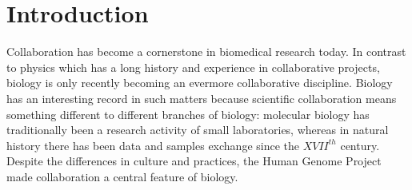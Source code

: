 \documentclass{bmcart}
\begin{document}
\begin{frontmatter}
\begin{abstractbox}
\begin{keyword}
\end{keyword}


\end{abstractbox}
%

\end{frontmatter}




\section*{Introduction}

Collaboration has become a cornerstone in biomedical research today.
In contrast to physics which has a long history and experience in
collaborative projects, biology is only recently becoming an evermore
collaborative discipline\cite{VermeulenPenders:2013}. Biology has an
interesting record in such matters because scientific collaboration
means something different to different branches of biology: molecular
biology has traditionally been a research activity of small
laboratories\cite{KnorrCetina:1999,Strasser:2006}, whereas in natural
history there has been data and samples exchange since the $XVII^{th}$
century\cite{MullerWille-etal:2012,Strasser:2012}. Despite the differences in
culture and practices, the Human Genome Project made collaboration a
central feature of biology.\\
\end{document}
